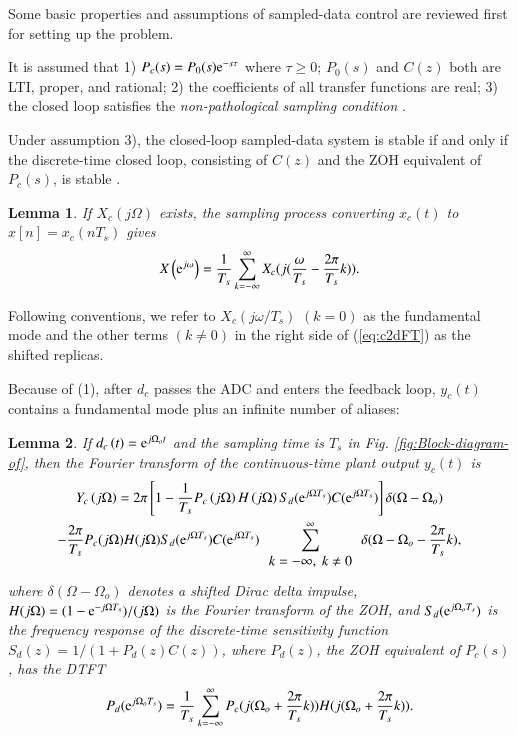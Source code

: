 \documentclass [11pt, proquest] {uwthesis}[2020/02/24]
\newtheorem{lemma}{Lemma}
\begin{document}
Some basic properties and assumptions of sampled-data control are
reviewed first for setting up the problem.

It is assumed that 1) $P_{c}(s)=P_{0}(s)\mathrm{e}^{-s\tau}$ where $\tau\geq0$;
$P_{0}(s)$ and $C(z)$ both are LTI, proper, and rational; 2) the
coefficients of all transfer functions are real; 3) the closed loop
satisfies the\emph{ non-pathological sampling condition} \cite{kalman_contributions_1963}.

Under assumption 3), the closed-loop sampled-data system is stable
if and only if the discrete-time closed loop, consisting of $C(z)$
and the ZOH equivalent of $P_{c}(s)$, is stable \cite{Francis1988,Middleton1995315}.

\begin{lemma}\cite{hayes2009statistical_DSP} \label{If--exists,}If
$X_{c}(j\Omega)$ exists, the sampling process converting $x_{c}(t)$
to $x[n]=x_{c}(nT_{s})$ gives
\begin{equation}
X\left(\mathrm{e}^{j\omega}\right)=\frac{1}{T_{s}}\sum_{k=-\infty}^{\infty}X_{c}(j(\frac{\omega}{T_{s}}-\frac{2\pi}{T_{s}}k)).\label{eq:c2dFT}
\end{equation}

\end{lemma}Following conventions, we refer to $X_{c}(j\omega/T_{s})$
$(k=0)$ as the fundamental mode and the other terms $(k\neq0)$ in
the right side of (\ref{eq:c2dFT}) as the shifted replicas.

Because of (1), after $d_{c}$ passes the ADC and enters the feedback
loop, $y_{c}(t)$ contains a fundamental mode plus an infinite number
of aliases:

\begin{lemma} \cite{astrom_computer-controlled_1996} If $d_{c}\left(t\right)=\mathrm{e}^{j\Omega_{o}t}$
and the sampling time is $T_{s}$ in Fig. \ref{fig:Block-diagram-of},
then the Fourier transform of the continuous-time plant output $y_{c}(t)$
is{\scriptsize{}
\begin{multline}
Y_{c}\left(j\Omega\right)=2\pi\left[1-\frac{1}{T_{s}}P_{c}\left(j\Omega\right)H\left(j\Omega\right)S_{d}(\e^{j\Omega T_{s}})C(\e^{j\Omega T_{s}})\right]\delta(\Omega-\Omega_{o})\\
-\frac{2\pi}{T_{s}}P_{c}(j\Omega)H(j\Omega)S_{d}(\e^{j\Omega T_{s}})C(\e^{j\Omega T_{s}})\sum_{\begin{array}{c}
k=-\infty,\ k\neq0\end{array}}^{\infty}\delta(\Omega-\Omega_{o}-\frac{2\pi}{T_{s}}k),\label{eq:distAtt}
\end{multline}
}where $\delta\left(\Omega-\Omega_{o}\right)$ denotes a shifted Dirac
delta impulse, $H(j\Omega)=(1-\mathrm{e}^{-j\Omega T_{s}})/(j\Omega)$ is
the Fourier transform of the ZOH, and $S_{d}(\mathrm{e}^{j\Omega_{o}T_{s}})$
is the frequency response of the discrete-time sensitivity function
$S_{d}(z)=1/(1+P_{d}(z)C(z))$, where $P_{d}(z)$, the ZOH equivalent
of $P_{c}(s)$, has the DTFT
\begin{equation}
P_{d}(\mathrm{e}^{j\Omega_{o}T_{s}})=\frac{1}{T_{s}}\sum_{k=-\infty}^{\infty}P_{c}(j(\Omega_{o}+\frac{2\pi}{T_{s}}k))H(j(\Omega_{o}+\frac{2\pi}{T_{s}}k)).\label{eq:Gamma-1}
\end{equation}
\end{lemma}
\end{document}
